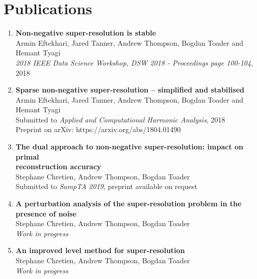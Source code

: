 \documentclass[11pt,a4paper,roman]{moderncv} %
\begin{document}
\section{Publications}


\begin{enumerate}

  \item
\textbf{Non-negative super-resolution is stable} \\
Armin Eftekhari, Jared Tanner, Andrew Thompson, Bogdan Toader and Hemant Tyagi\\
{\em 2018 IEEE Data Science Workshop, DSW 2018 - Proceedings page 100-104},
2018 
\vspace{1em}
  
  \item
\textbf{Sparse non-negative super-resolution -- simplified and stabilised} \\
Armin Eftekhari, Jared Tanner, Andrew Thompson, Bogdan Toader and Hemant Tyagi\\
Submitted to {\em Applied and Computational Harmonic Analysis},
2018 \\
Preprint on arXiv: https://arxiv.org/abs/1804.01490
\vspace{1em}

  \item
\textbf{The dual approach to non-negative super-resolution: 
  impact on primal\\ reconstruction accuracy}\\
Stephane Chretien, Andrew Thompson, Bogdan Toader\\
Submitted to {\em SampTA 2019},
preprint available on request
\vspace{1em}
\newpage
  \item
\textbf{A perturbation analysis of the super-resolution problem
in the presence of noise}\\
Stephane Chretien, Andrew Thompson, Bogdan Toader\\
{\em Work in progress}
\vspace{1em}

  \item
\textbf{An improved level method for super-resolution}\\
Stephane Chretien, Andrew Thompson, Bogdan Toader\\
{\em Work in progress}
\vspace{1em}

\end{enumerate}
\end{document}
